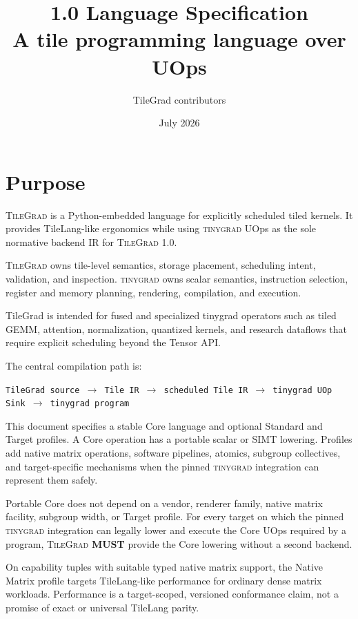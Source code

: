 \documentclass[10pt,letterpaper]{article}
\title{\TileGrad{} 1.0 Language Specification\\
\large A tile programming language over \tinygrad{} UOps}
\author{TileGrad contributors}
\date{July 2026}
\newcommand{\TileGrad}{\textsc{TileGrad}}
\newcommand{\tinygrad}{\textsc{tinygrad}}
\newcommand{\must}{\textbf{MUST}}
\begin{document}
\maketitle
\thispagestyle{empty}

\section*{Purpose}

\TileGrad{} is a Python-embedded language for explicitly scheduled tiled
kernels. It provides TileLang-like ergonomics while using \tinygrad{} UOps as
the sole normative backend IR for \TileGrad{} 1.0.

\TileGrad{} owns tile-level semantics, storage placement, scheduling intent,
validation, and inspection. \tinygrad{} owns scalar semantics, instruction
selection, register and memory planning, rendering, compilation, and execution.

TileGrad is intended for fused and specialized tinygrad operators such as
tiled GEMM, attention, normalization, quantized kernels, and research dataflows
that require explicit scheduling beyond the Tensor API.

The central compilation path is:

\begin{center}
\texttt{TileGrad source $\to$ Tile IR $\to$ scheduled Tile IR $\to$
tinygrad UOp Sink $\to$ tinygrad program}
\end{center}

This document specifies a stable Core language and optional Standard and Target
profiles. A Core operation has a portable scalar or SIMT lowering. Profiles add
native matrix operations, software pipelines, atomics, subgroup collectives,
and target-specific mechanisms when the pinned \tinygrad{} integration can
represent them safely.

Portable Core does not depend on a vendor, renderer family, native matrix
facility, subgroup width, or Target profile. For every target on which the
pinned \tinygrad{} integration can legally lower and execute the Core UOps
required by a program, \TileGrad{} \must{} provide the Core lowering without a
second backend.

On capability tuples with suitable typed native matrix support, the Native
Matrix profile targets TileLang-like performance for ordinary dense matrix
workloads. Performance is a target-scoped, versioned conformance claim, not a
promise of exact or universal TileLang parity.
\end{document}
